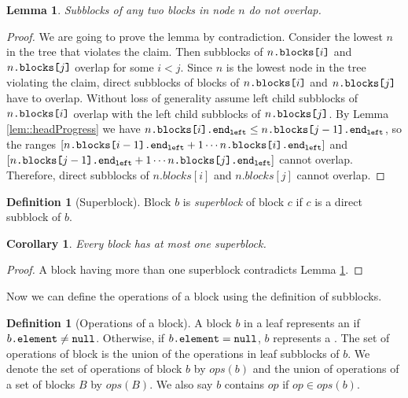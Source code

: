 \documentclass[10pt]{article}
\newcommand{\sub}[1]{\textsubscript{#1}}
\renewcommand{\it}[1]{\textit{#1}}
\newcommand{\nf}[1]{{\normalfont{\texttt{#1}}}}
\newtheorem{lemma}[theorem]{Lemma}
\newtheorem{corollary}[theorem]{Corollary}
\theoremstyle{definition}
\newtheorem{definition}[theorem]{Definition}
\begin{document}
\begin{lemma} \label{lem::subblocksDistinct}
Subblocks of any two blocks in node $n$ do not overlap.  
\end{lemma}
\begin{proof}
We are going to prove the lemma by contradiction. Consider the lowest \nf{node} $n$ in the tree that violates the claim. Then subblocks of $n\nf{.blocks[}i\nf{]}$ and $n\nf{.blocks[}j\nf{]}$ overlap for some $i<j$. Since $n$ is the lowest node in the tree violating the claim, direct subblocks of blocks of $n\nf{.blocks[}i\nf{]}$ and $n\nf{.blocks[}j\nf{]}$ have to overlap. Without loss of generality assume left child subblocks of $n\nf{.blocks[}i\nf{]}$ overlap with the left child subblocks of $n\nf{.blocks[}j\nf{]}$. By Lemma \ref{lem::headProgress} we have $ \nf{$n$.blocks[$i$].end\sub{left}} \leq \nf{$n$.blocks[$j-1$].end\sub{left}}$, so the ranges $[\nf{$n$.blocks[$i-1$].end\sub{left}}+1 \cdots \nf{$n$.blocks[$i$].end\sub{left}}]$ and $[\nf{$n$.blocks[$j-1$].end\sub{left}}+1 \cdots \nf{$n$.blocks[$j$].end\sub{left}}]$ cannot overlap. Therefore, direct subblocks of $n.blocks[i]$ and $n.blocks[j]$ cannot overlap.
\end{proof}

\begin{definition}[Superblock]
  Block $b$ is \it{superblock} of block $c$ if $c$ is a direct subblock of $b$.
\end{definition}
\begin{corollary}
Every block has at most one superblock.
\end{corollary}
\begin{proof}
A block having more than one superblock contradicts Lemma \ref{lem::subblocksDistinct}.
\end{proof}

Now we can define the operations of a block using the definition of subblocks.
\begin{definition}[Operations of a block]\label{def::ops}
A block $b$ in a leaf represents an \nf{Enqueue()} if $b\nf{.element}\neq\nf{null}$. Otherwise, if $b\nf{.element}=\nf{null}$, $b$ represents a \nf{Dequeue()}. The set of operations of block \nf{b} is the union of the operations in leaf subblocks of $b$. We denote the set of operations of block $b$ by ${ops(b)}$ and the union  of operations of a set of blocks $B$ by $ops(B)$.  We also say ${b}$ contains ${op}$ if $op\in{ops(b)}$.
\end{definition}
\end{document}
